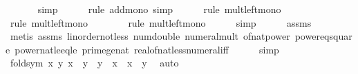 \begin{isabellebody}
\ \ \ \ \ \isamarkupfalse%
\ simp\isanewline
\ \ \ \ \isamarkupfalse%
\ {\isacharparenleft}{\kern0pt}rule\ add{\isacharunderscore}{\kern0pt}mono{\isacharcomma}{\kern0pt}\ simp{\isacharparenright}{\kern0pt}\isanewline
\ \ \ \ \isamarkupfalse%
\ {\isacharparenleft}{\kern0pt}rule\ mult{\isacharunderscore}{\kern0pt}left{\isacharunderscore}{\kern0pt}mono{\isacharparenright}{\kern0pt}\isanewline
\ \ \ \ \isamarkupfalse%
\ {\isacharparenleft}{\kern0pt}rule\ mult{\isacharunderscore}{\kern0pt}left{\isacharunderscore}{\kern0pt}mono{\isacharparenright}{\kern0pt}\isanewline
\ \ \ \ \ \ \isamarkupfalse%
\ {\isacharparenleft}{\kern0pt}rule\ mult{\isacharunderscore}{\kern0pt}left{\isacharunderscore}{\kern0pt}mono{\isacharparenright}{\kern0pt}\isanewline
\ \ \ \ \isamarkupfalse%
\ simp\isanewline
\ \ \ \ \isamarkupfalse%
\ assms{\isacharparenleft}{\kern0pt}{}{\isacharparenright}{\kern0pt}\ \isanewline
\ \ \ \ \ \ \ \isamarkupfalse%
\ {\isacharparenleft}{\kern0pt}metis\ assms{\isacharparenleft}{\kern0pt}{}{\isacharparenright}{\kern0pt}\ linorder{\isacharunderscore}{\kern0pt}not{\isacharunderscore}{\kern0pt}less\ num{\isacharunderscore}{\kern0pt}double\ numeral{\isacharunderscore}{\kern0pt}mult\ of{\isacharunderscore}{\kern0pt}nat{\isacharunderscore}{\kern0pt}power\ power{}{\isacharunderscore}{\kern0pt}eq{\isacharunderscore}{\kern0pt}square\ power{}{\isacharunderscore}{\kern0pt}nat{\isacharunderscore}{\kern0pt}le{\isacharunderscore}{\kern0pt}eq{\isacharunderscore}{\kern0pt}le\ prime{\isacharunderscore}{\kern0pt}ge{\isacharunderscore}{\kern0pt}{}{\isacharunderscore}{\kern0pt}nat\ real{\isacharunderscore}{\kern0pt}of{\isacharunderscore}{\kern0pt}nat{\isacharunderscore}{\kern0pt}less{\isacharunderscore}{\kern0pt}numeral{\isacharunderscore}{\kern0pt}iff{\isacharparenright}{\kern0pt}\isanewline
\ \ \ \ \isamarkupfalse%
\ simp{\isacharplus}{\kern0pt}\isanewline
\isanewline
\ \ \isamarkupfalse%
\ fold{\isacharunderscore}{\kern0pt}sym{\isacharcolon}{\kern0pt}\ {\isachardoublequoteopen}{\isasymAnd}x\ y{\isachardot}{\kern0pt}\ {\isacharparenleft}{\kern0pt}x\ {\isasymnoteq}\ y\ {\isasymand}\ y\ {\isasymnoteq}\ x{\isacharparenright}{\kern0pt}\ {\isacharequal}{\kern0pt}\ {\isacharparenleft}{\kern0pt}x\ {\isasymnoteq}\ y{\isacharparenright}{\kern0pt}{\isachardoublequoteclose}\ \isamarkupfalse%
\ auto\isanewline
\isanewline
\ \ \isamarkupfalse%

\end{isabellebody}
